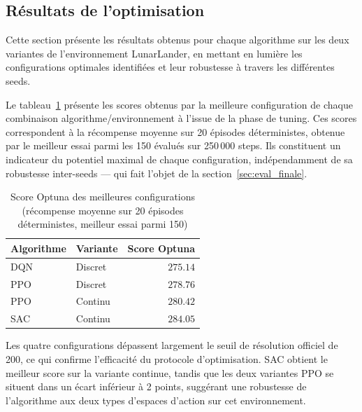 \endgroup

\subsection{Résultats de l'optimisation}

Cette section présente les résultats obtenus pour chaque algorithme sur les
deux variantes de l'environnement LunarLander, en mettant en lumière les
configurations optimales identifiées et leur robustesse à travers les
différentes seeds.
 
 
Le tableau~\ref{tab:scores_optuna} présente les scores obtenus par la
meilleure configuration de chaque combinaison algorithme/environnement à
l'issue de la phase de tuning. Ces scores correspondent à la récompense
moyenne sur 20 épisodes déterministes, obtenue par le meilleur essai parmi
les 150 évalués sur 250\,000 steps. Ils constituent un indicateur du
potentiel maximal de chaque configuration, indépendamment de sa robustesse
inter-seeds --- qui fait l'objet de la section~\ref{sec:eval_finale}.
 
\begin{table}[h!]
\centering
\footnotesize
\renewcommand{\arraystretch}{1.3}
\caption{Score Optuna des meilleures configurations (récompense moyenne sur
         20 épisodes déterministes, meilleur essai parmi 150)}
\label{tab:scores_optuna}
\begin{tabular}{llr}
  \toprule
  \textbf{Algorithme} & \textbf{Variante} & \textbf{Score Optuna} \\
  \midrule
  DQN & Discret  & $275.14$ \\
  PPO & Discret  & $278.76$ \\
  PPO & Continu  & $280.42$ \\
  SAC & Continu  & $284.05$ \\
  \bottomrule
\end{tabular}
\end{table}
 
Les quatre configurations dépassent largement le seuil de résolution officiel
de 200, ce qui confirme l'efficacité du protocole d'optimisation. SAC obtient
le meilleur score sur la variante continue, tandis que les deux variantes PPO
se situent dans un écart inférieur à 2 points, suggérant une robustesse de
l'algorithme aux deux types d'espaces d'action sur cet environnement.
 
